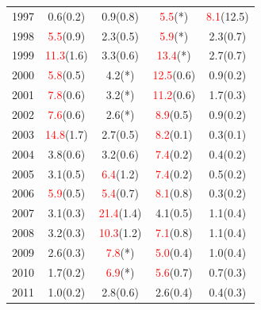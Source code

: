 \documentclass[paperwidth=58in,paperheight=47in,portrait]{baposter}
\begin{document}
\begin{poster}
{\begin{center}
{\begin{tabular}{r|c|c|c|c}
        1997 &   0.6(0.2) &   0.9(0.8) &   \textcolor{red}{5.5}(*) &  \textcolor{red}{8.1}(12.5) \\

        1998 &   \textcolor{red}{5.5}(0.9) &   2.3(0.5) &   \textcolor{red}{5.9}(*) &   2.3(0.7) \\

        1999 &  \textcolor{red}{11.3}(1.6) &   3.3(0.6) &       \textcolor{red}{13.4}(*) &   2.7(0.7) \\

        2000 &   \textcolor{red}{5.8}(0.5) &        4.2(*) &  \textcolor{red}{12.5}(0.6) &   0.9(0.2) \\

        2001 &   \textcolor{red}{7.8}(0.6) &        3.2(*) &  \textcolor{red}{11.2}(0.6) &   1.7(0.3) \\

        2002 &   \textcolor{red}{7.6}(0.6) &        2.6(*) &   \textcolor{red}{8.9}(0.5) &   0.9(0.2) \\

        2003 &  \textcolor{red}{14.8}(1.7) &   2.7(0.5) &   \textcolor{red}{8.2}(0.1) &   0.3(0.1) \\

        2004 &   3.8(0.6) &   3.2(0.6) &   \textcolor{red}{7.4}(0.2) &   0.4(0.2) \\

        2005 &   3.1(0.5) &   \textcolor{red}{6.4}(1.2) &   \textcolor{red}{7.4}(0.2) &   0.5(0.2) \\

        2006 &   \textcolor{red}{5.9}(0.5) &  \textcolor{red}{5.4}(0.7) &   \textcolor{red}{8.1}(0.8) &   0.3(0.2) \\

        2007 &   3.1(0.3) &  \textcolor{red}{21.4}(1.4) &   4.1(0.5) &   1.1(0.4) \\

        2008 &   3.2(0.3) &  \textcolor{red}{10.3}(1.2) &   \textcolor{red}{7.1}(0.8) &   1.1(0.4) \\

        2009 &   2.6(0.3) &        \textcolor{red}{7.8}(*) &   \textcolor{red}{5.0}(0.4) &   1.0(0.4) \\

        2010 &   1.7(0.2) &        \textcolor{red}{6.9}(*) &   \textcolor{red}{5.6}(0.7) &   0.7(0.3) \\

        2011 &   1.0(0.2) &   2.8(0.6) &   2.6(0.4) &   0.4(0.3) \\


\end{tabular}}
\end{center}}
\end{poster}
\end{document}
